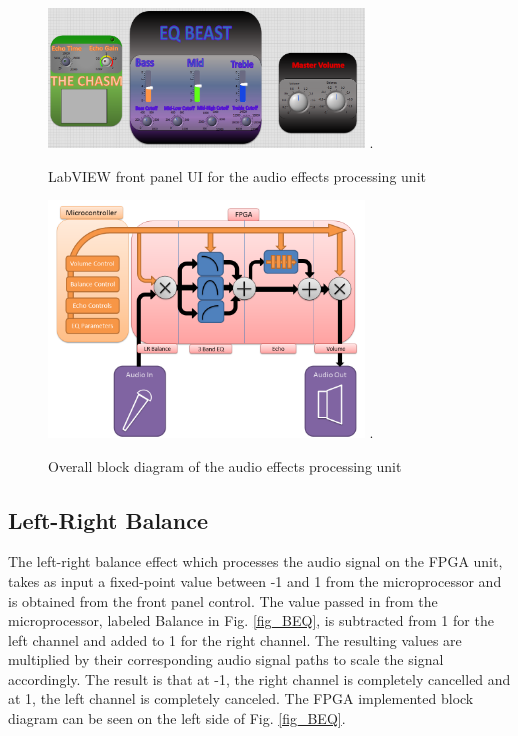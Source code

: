 \begin{figure}[!t]
\centering
\includegraphics[width=3.3in]{frontpanel.png}
\DeclareGraphicsExtensions.
\caption{LabVIEW front panel UI for the audio effects processing unit}
\label{fig_AEPUfp}
\end{figure}

\begin{figure}[!t]
\centering
\includegraphics[width=3.3in]{aepublock.png}
\DeclareGraphicsExtensions.
\caption{Overall block diagram of the audio effects processing unit}
\label{fig_AEPUBlock}
\end{figure}



\subsection{Left-Right Balance}
The left-right balance effect which processes the audio signal on the FPGA unit, takes as input a fixed-point value between -1 and 1 from the microprocessor and is obtained from the front panel control. 
The value passed in from the microprocessor, labeled Balance in Fig. \ref{fig_BEQ}, is subtracted from 1 for the left channel and added to 1 for the right channel. 
The resulting values are multiplied by their corresponding audio signal paths to scale the signal accordingly. The result is that at -1, the right channel is completely cancelled and at 1, the left channel is completely canceled. 
The FPGA implemented block diagram can be seen on the left side of Fig. \ref{fig_BEQ}.

